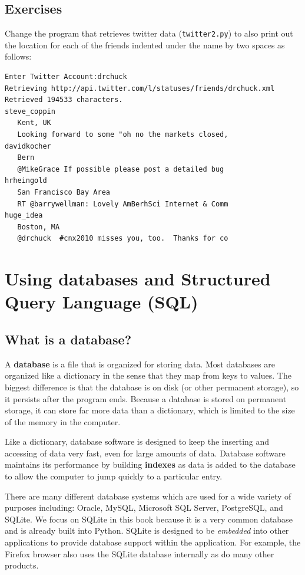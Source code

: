 \documentclass[11pt]{book}
\begin{document}
\section{Exercises}

\begin{ex}
Change the program that retrieves twitter data 
({\tt twitter2.py}) to also
print out the location for each of the friends
indented under the name by two spaces as follows:

\beforeverb
\begin{verbatim}
Enter Twitter Account:drchuck
Retrieving http://api.twitter.com/l/statuses/friends/drchuck.xml
Retrieved 194533 characters.
steve_coppin
   Kent, UK
   Looking forward to some "oh no the markets closed,
davidkocher
   Bern
   @MikeGrace If possible please post a detailed bug 
hrheingold
   San Francisco Bay Area
   RT @barrywellman: Lovely AmBerhSci Internet & Comm
huge_idea
   Boston, MA
   @drchuck  #cnx2010 misses you, too.  Thanks for co
\end{verbatim}
\afterverb
%
\end{ex}

\chapter{Using databases and Structured Query Language (SQL)}

\section{What is a database?}

A {\bf database} is a file that is organized for storing data.
Most databases are organized like a dictionary in the sense
that they map from keys to values.  The biggest difference
is that the database is on disk (or other permanent storage),
so it persists after the program ends.  Because a database is
stored on permanent storage, it can store far more data than
a dictionary, which is limited to the size of the memory 
in the computer.

Like a dictionary, database software is designed to keep 
the inserting and accessing of data very fast, even for large
amounts of data.   Database software maintains its performance by 
building {\bf indexes} as data is added to the database
to allow the computer to jump quickly to a particular
entry.

There are many different database systems which are used for a wide
variety of purposes including: Oracle, MySQL, Microsoft SQL Server, 
PostgreSQL, and SQLite.  We focus on SQLite in this book because
it is a very common database and is already built into Python.  
SQLite is designed to be \emph{embedded} into other applications
to provide database support within the application.  For example,
the Firefox browser also uses the SQLite database internally as do 
many other products.
\end{document}
